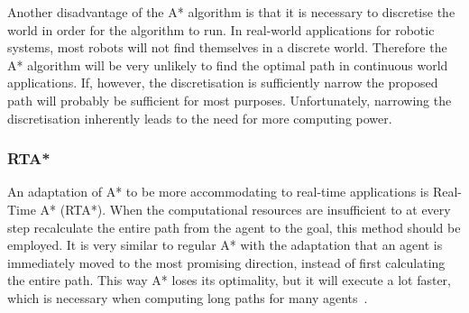 			Another disadvantage of the A* algorithm is that it is necessary to discretise the world in order for the algorithm to run. In real-world applications for robotic systems, most robots will not find themselves in a discrete world. Therefore the A* algorithm will be very unlikely to find the optimal path in continuous world applications. If, however, the discretisation is sufficiently narrow the proposed path will probably be sufficient for most purposes. Unfortunately, narrowing the discretisation inherently leads to the need for more computing power.\cite{ASta2:online, korf1990real}

			\subsubsection{RTA*}
				An adaptation of A* to be more accommodating to real-time applications is Real-Time A* (RTA*). When the computational resources are insufficient to at every step recalculate the entire path from the agent to the goal, this method should be employed. It is very similar to regular A* with the adaptation that an agent is immediately moved to the most promising direction, instead of first calculating the entire path. This way A* loses its optimality, but it will execute a lot faster, which is necessary when computing long paths for many agents~\cite{korf1990real, rtastar, undeger2009real, undeger2010multi, undeger2007single}.

